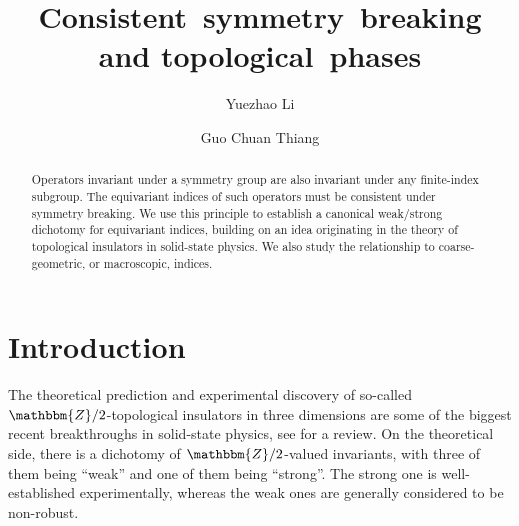 \documentclass{amsart}
\numberwithin{figure}{section}
\numberwithin{equation}{section}
\numberwithin{table}{section}
\theoremstyle{plain}
\theoremstyle{definition}
\theoremstyle{remark}
\theoremstyle{nonumber}
\newcommand{\Z}{\mathbb{Z}}
\renewcommand{\mathbb}{\mathbbm} %
\begin{document}
\title{Consistent~symmetry~breaking and topological~phases}
\author{Yuezhao Li}
\address{Max-Planck-Institut f\"ur Mathematik \\
Bonn \\
Germany}
\author{Guo Chuan Thiang}
\address{Beijing International Center
for Mathematical Research \\ 
Peking University \\
China}



\begin{abstract}
Operators invariant under a symmetry group are also invariant under any
finite-index subgroup. The equivariant indices of such operators must be
consistent under symmetry breaking. We use this principle to establish a
canonical weak/strong dichotomy for equivariant indices, building on an idea
originating in the theory of topological insulators in solid-state physics.
We also study the relationship to coarse-geometric, or macroscopic,
indices. 
\end{abstract}

\maketitle
\setcounter{tocdepth}{2}
\tableofcontents

\section{Introduction}
The theoretical prediction
\cites{Fu-Kane:Topological_insulators_with_inversion_symmetry,
Fu-Kane-Mele:TI_in_3D, Moore-Balents:Topological_invariants_TRS} and
experimental discovery
\cite{Hsieh_etal:Topological_Dirac_insulator_QSH} of
so-called $\Z/2$-topological insulators in three dimensions are some of the
biggest recent breakthroughs in solid-state physics, see \cite{Hasan-Moore:3D_TI} for a review. On the theoretical
side, there is a dichotomy of $\Z/2$-valued invariants, with three of them
being ``weak'' and one of them being ``strong''. The strong one is
well-established experimentally, whereas the weak ones are generally
considered to be non-robust.
\end{document}

